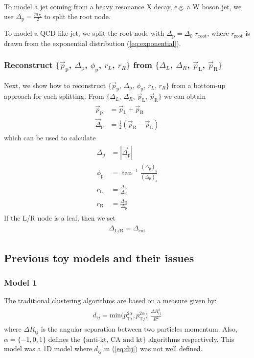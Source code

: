 \documentclass[12pt]{article}
\newcommand{\bea}{\begin{eqnarray}\begin{aligned}}
\newcommand{\eea}{\end{aligned}\end{eqnarray}}
\begin{document}
To model a jet coming from a heavy resonance X decay, e.g. a W boson jet, we use $\Delta_{\text{p}} =  \frac{m_X}{2}$ to split the root node.

To model a QCD like jet, we split the root node with $\Delta_{\text{p}} = \Delta_0 \,\, r_{\text{root}}$, where $r_{\text{root}}$ is drawn from the exponential distribution (\ref{eq:exponential}).

\subsubsection{Reconstruct $\{\vec{p}_\text{p}$, $\Delta_{\text{p}}$, $\phi_{\text{p}}$, $r_L$, $r_R\}$ from  $\{\Delta_L$, $\Delta_R$, $\vec{p}_\text{L}$, $ \vec{p}_\text{R}\}$ }

Next, we show how to reconstruct $\{\vec{p}_\text{p}$, $\Delta_{\text{p}}$, $\phi_{\text{p}}$, $r_L$, $r_R\}$ from a bottom-up approach for each splitting. From  $\{\Delta_L$, $\Delta_R$, $\vec{p}_\text{L}$, $ \vec{p}_\text{R}\}$ we can obtain
\bea
\vec{p}_\text{p} &= \vec{p}_\text{L}+ \vec{p}_\text{R}\\
\vec{\Delta}_\text{p} &= \frac{1}{2} (\vec{p}_\text{R} - \vec{p}_\text{L})
\eea
which can be used to calculate
\bea
\Delta_\text{p} &= | \vec{ \Delta}_\text{p} |\\
\phi_{\text{p}} &=\tan^{-1}\frac{(\Delta_\text{p})_y}{(\Delta_\text{p})_z}\\
r_{\text{L}} &=\frac{\Delta_{\text{L}}}{\Delta_{\text{p}}}\\
r_{\text{R}} &=\frac{\Delta_{\text{R}}}{\Delta_{\text{p}}}
\eea
If the L/R node is a leaf, then we set
\bea
\Delta_{\text{L/R}}=\Delta_{\text{cut}}
\eea









\subsection{Previous toy models and their issues}


\subsubsection{Model 1}

The traditional clustering algorithms are based on a measure given by:
\bea\label{eq:dij}
d_{ij}= \text{min}({p_{\text{T}i}^{2\alpha}, {p_{\text{T}j}^{2\alpha}})\,\, \frac{\Delta R_{ij}^2}{R^2}}
\eea
where $\Delta R_{ij}$ is the angular separation between two particles momentum. Also, $\alpha=\{-1,0,1\}$ defines the $\{\text{anti-kt, CA and kt}\}$ algorithms respectively. 
This model was a 1D model where $d_{ij}$ in (\ref{eq:dij}) was not well defined.
\end{document}
